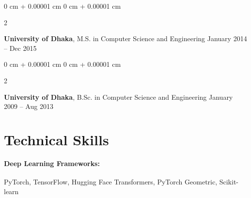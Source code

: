 \documentclass[10pt, letterpaper]{article}
\newenvironment{highlights}{
    \begin{itemize}[
        topsep=0.10 cm,
        parsep=0.10 cm,
        partopsep=0pt,
        itemsep=0pt,
        leftmargin=0 cm + 10pt
    ]
}{
    \end{itemize}
} %
\newenvironment{onecolentry}{
    \begin{adjustwidth}{
        0 cm + 0.00001 cm
    }{
        0 cm + 0.00001 cm
    }
}{
    \end{adjustwidth}
} %
\newenvironment{twocolentry}[2][]{
    \onecolentry
    \def\secondColumn{#2}
    \setcolumnwidth{\fill, 4.5 cm}
    \begin{paracol}{2}
}{
    \switchcolumn \raggedleft \secondColumn
    \end{paracol}
    \endonecolentry
} %
\begin{document}
        \begin{twocolentry}{
            January 2014 – Dec 2015
        }
            \textbf{University of Dhaka}, M.S. in Computer Science and Engineering\end{twocolentry}


        \begin{twocolentry}{
            January 2009 – Aug 2013
        }
            \textbf{University of Dhaka}, B.Sc. in Computer Science and Engineering\end{twocolentry}
    
        




\vspace{-1mm}
\section{Technical Skills}

        \paragraph{Deep Learning Frameworks:} PyTorch, TensorFlow, Hugging Face Transformers, PyTorch Geometric, Scikit-learn
        \vspace{-4mm}
\end{document}

